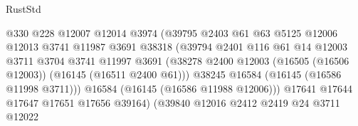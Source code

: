 \begin{lexlean}{RustStd}
\begin{coremodule}
                                          @330
                                          @228
                                          @12007
                                          @12014
                                          @3974
                                          (@39795
                                            @2403
                                            @61
                                            @63
                                            @5125
                                            @12006
                                            @12013
                                            @3741
                                            @11987
                                            @3691
                                            @38318
                                            (@39794
                                              @2401
                                              @116
                                              @61
                                              @14
                                              @12003
                                              @3711
                                              @3704
                                              @3741
                                              @11997
                                              @3691
                                              (@38278
                                                @2400
                                                @12003
                                                (@16505 (@16506 @12003))
                                                (@16145 (@16511 @2400 @61)))
                                              @38245
                                              @16584
                                              (@16145 (@16586 @11998 @3711)))
                                            @16584
                                            (@16145 (@16586 @11988 @12006)))
                                          @17641
                                          @17644
                                          @17647
                                          @17651
                                          @17656
                                          @39164)
                                        (@39840
                                          @12016
                                          @2412
                                          @2419
                                          @24
                                          @3711
                                          @12022

\end{coremodule}
\end{lexlean}
